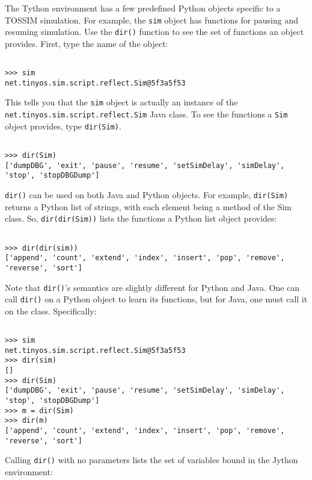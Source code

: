 \documentclass[10pt]{article}
\newcommand{\name}{{Tython}\xspace}
\begin{document}
The \name environment has a few predefined Python objects specific to
a TOSSIM simulation. For example, the {\tt sim} object has functions for
pausing and resuming simulation. Use the {\tt dir()} function to see
the set of functions an object provides. First, type the name of the object:

\begin{verbatim}

>>> sim
net.tinyos.sim.script.reflect.Sim@5f3a5f53

\end{verbatim}

This tells you that the {\tt sim} object is actually an instance of the
{\tt net.tinyos.sim.script.reflect.Sim} Java class. To see the functions a
{\tt Sim} object provides, type {\tt dir(Sim)}.

\begin{verbatim}

>>> dir(Sim)
['dumpDBG', 'exit', 'pause', 'resume', 'setSimDelay', 'simDelay', 'stop', 'stopDBGDump']

\end{verbatim}

{\tt dir()} can be used on both Java and Python objects. For example,
{\tt dir(Sim)} returns a Python list of strings, with each element being a
method of the Sim class. So, {\tt dir(dir(Sim))} lists the functions
a Python list object provides:

\begin{verbatim}

>>> dir(dir(sim))
['append', 'count', 'extend', 'index', 'insert', 'pop', 'remove', 'reverse', 'sort']

\end{verbatim}

Note that {\tt dir()}'s semantics are slightly different for Python and
Java. One can call {\tt dir()} on a Python object to learn its functions,
but for Java, one must call it on the class. Specifically:


\begin{verbatim}

>>> sim
net.tinyos.sim.script.reflect.Sim@5f3a5f53
>>> dir(sim)
[]
>>> dir(Sim)
['dumpDBG', 'exit', 'pause', 'resume', 'setSimDelay', 'simDelay', 'stop', 'stopDBGDump']
>>> m = dir(Sim)
>>> dir(m) 
['append', 'count', 'extend', 'index', 'insert', 'pop', 'remove', 'reverse', 'sort']

\end{verbatim}

Calling {\tt dir()} with no parameters lists the set of variables
bound in the Jython environment:
\end{document}
